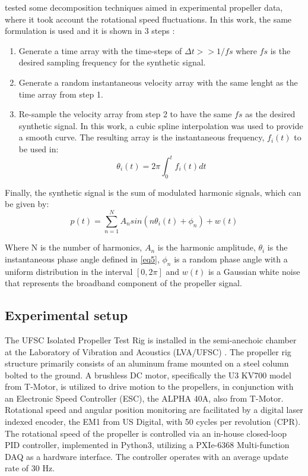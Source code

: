\documentclass[10pt,fleqn,a4paper,twoside]{article}
\begin{document}
\cite{bonomo} tested some decomposition techniques aimed in experimental propeller data, where it took account the rotational speed fluctuations. In this work, the same formulation is used and it is shown in 3 steps \citep{bonomo}:
\begin{enumerate}
    \item Generate a time array with the time-steps of $\Delta t >> 1/ fs$ where $fs$ is the desired sampling frequency for the synthetic signal.
    \item Generate a random instantaneous velocity array with the same lenght as the time array from step 1.
    \item Re-sample the velocity array from step 2 to have the same $fs$ as the desired synthetic signal. In this work, a cubic spline interpolation was used to provide a smooth curve. The resulting array  is the instantaneous frequency, $f_i(t)$ to be used in:
    \begin{equation}
        \label{eq5}
        \theta_i (t)=2\pi \int_{0}^{t}f_i (t)dt
    \end{equation}
\end{enumerate} 

Finally, the synthetic signal is the sum of modulated harmonic signals, which can be given by:
\begin{equation}
    \label{eq6}
    p(t) = \sum_{n=1}^{N} A_n sin(n\theta_i (t) + \phi_n) + w(t)
\end{equation}

Where N is the number of harmonics, $A_n$ is the harmonic amplitude, $\theta_i$ is the instantaneous phase angle defined in \ref{eq5}, $\phi_n$ is a random phase angle with a uniform distribution in the interval $[0,2\pi]$ and $w(t)$ is a Gaussian white noise that represents the broadband component of the propeller signal.

\subsection{Experimental setup}
The UFSC Isolated Propeller Test Rig is installed in the semi-anechoic chamber at the Laboratory of Vibration and Acoustics (LVA/UFSC) \citep{Augusto}. The propeller rig structure primarily consists of an aluminum frame mounted on a steel column bolted to the ground. A brushless DC motor, specifically the U3 KV700 model from T-Motor, is utilized to drive
motion to the propellers, in conjunction with an Electronic Speed Controller (ESC), the ALPHA 40A, also from T-Motor.
Rotational speed and angular position monitoring are facilitated by a digital laser indexed encoder, the EM1 from US
Digital, with 50 cycles per revolution (CPR).
The rotational speed of the propeller is controlled via an in-house closed-loop PID controller, implemented in
Python3, utilizing a PXIe-6368 Multi-function DAQ as a hardware interface. The controller operates with an average
update rate of 30 Hz.
\end{document}
